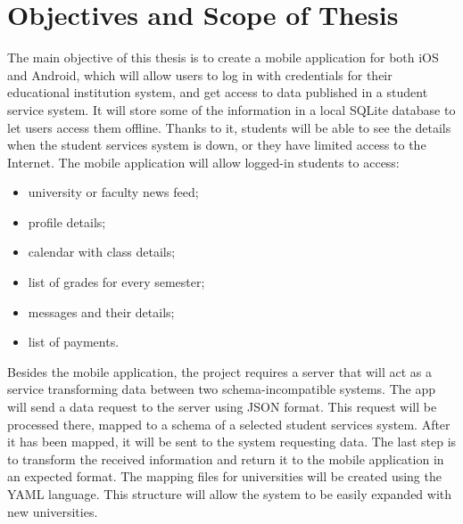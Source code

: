 \section{Objectives and Scope of Thesis}
The main objective of this thesis is to create a mobile application for both iOS and Android, which will allow users to log in with credentials for their educational institution system, and get access to data published in a student service system. It will store some of the information in a local SQLite database to let users access them offline. Thanks to it, students will be able to see the details when the student services system is down, or they have limited access to the Internet. 
The mobile application will allow logged-in students to access:
\begin{multicols}{2}
\begin{itemize}
    \item university or faculty news feed;
    \item profile details;
    \item calendar with class details;
    \item list of grades for every semester;
    \item messages and their details;
    \item list of payments.
\end{itemize}
\end{multicols}
Besides the mobile application, the project requires a server that will act as a service transforming data between two schema-incompatible systems. The app will send a data request to the server using JSON format. This request will be processed there, mapped to a schema of a selected student services system. After it has been mapped, it will be sent to the system requesting data. The last step is to transform the received information and return it to the mobile application in an expected format. The mapping files for universities will be created using the YAML language. This structure will allow the system to be easily expanded with new universities.

